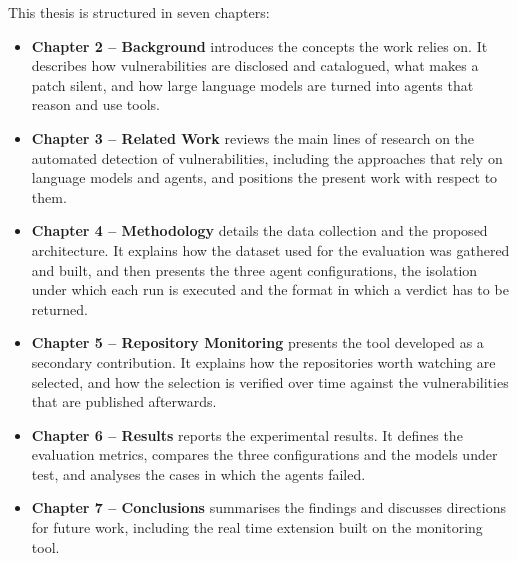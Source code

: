     This thesis is structured in seven chapters:

    \begin{itemize}
        \item \textbf{Chapter 2 -- Background} introduces the concepts the work relies on. It
              describes how vulnerabilities are disclosed and catalogued, what makes a patch
              silent, and how large language models are turned into agents that reason and use
              tools.

        \item \textbf{Chapter 3 -- Related Work} reviews the main lines of research on the
              automated detection of vulnerabilities, including the approaches that rely on
              language models and agents, and positions the present work with respect to them.

        \item \textbf{Chapter 4 -- Methodology} details the data collection and the proposed
              architecture. It explains how the dataset used for the evaluation was gathered and
              built, and then presents the three agent configurations, the isolation under which
              each run is executed and the format in which a verdict has to be returned.

        \item \textbf{Chapter 5 -- Repository Monitoring} presents the tool developed as a
              secondary contribution. It explains how the repositories worth watching are
              selected, and how the selection is verified over time against the vulnerabilities
              that are published afterwards.

        \item \textbf{Chapter 6 -- Results} reports the experimental results. It defines the
              evaluation metrics, compares the three configurations and the models under test, and
              analyses the cases in which the agents failed.

        \item \textbf{Chapter 7 -- Conclusions} summarises the findings and discusses directions
              for future work, including the real time extension built on the monitoring tool.
    \end{itemize}
